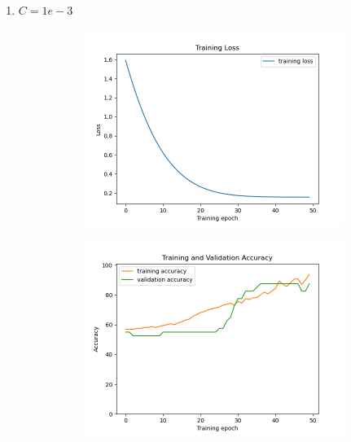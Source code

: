 \documentclass[a4paper]{article}
\begin{document}
\begin{enumerate}
\begin{enumerate}
        \item $C = 1e-3$
        \begin{figure}[H]
            \centering
                \begin{subfigure}[b]{.45\linewidth}
                    \includegraphics[width=\linewidth]{../../img/3-1.png}
                \end{subfigure}
                \begin{subfigure}[b]{.45\linewidth}
                    \includegraphics[width=\linewidth]{../../img/3-2.png}
                \end{subfigure}
                \begin{subfigure}[b]{.45\linewidth}

\end{subfigure}
\end{figure}
\end{enumerate}
\end{enumerate}
\end{document}
